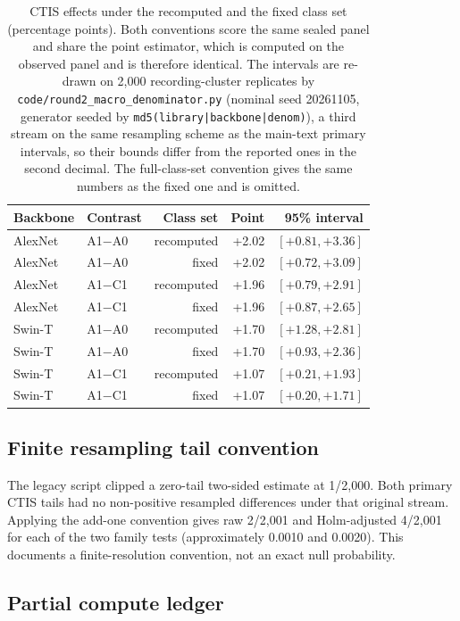 \begin{table}[t]
\centering
\caption{CTIS effects under the recomputed and the fixed class set (percentage points). Both
conventions score the same sealed panel and share the point estimator, which is computed on the
observed panel and is therefore identical. The intervals are re-drawn on 2{,}000
recording-cluster replicates by \texttt{code/round2\_macro\_denominator.py} (nominal seed
20261105, generator seeded by \texttt{md5(library|backbone|denom)}), a third stream on the same
resampling scheme as the main-text primary intervals, so their bounds differ
from the reported ones in the second decimal. The full-class-set convention gives the same
numbers as the fixed one and is omitted.}
\label{tab:classset}
\small
\begin{tabular}{llrrr}
\toprule
Backbone & Contrast & Class set & Point & 95\% interval \\
\midrule
AlexNet & A1$-$A0 & recomputed & +2.02 & $[+0.81,+3.36]$ \\
AlexNet & A1$-$A0 & fixed      & +2.02 & $[+0.72,+3.09]$ \\
AlexNet & A1$-$C1 & recomputed & +1.96 & $[+0.79,+2.91]$ \\
AlexNet & A1$-$C1 & fixed      & +1.96 & $[+0.87,+2.65]$ \\
Swin-T  & A1$-$A0 & recomputed & +1.70 & $[+1.28,+2.81]$ \\
Swin-T  & A1$-$A0 & fixed      & +1.70 & $[+0.93,+2.36]$ \\
Swin-T  & A1$-$C1 & recomputed & +1.07 & $[+0.21,+1.93]$ \\
Swin-T  & A1$-$C1 & fixed      & +1.07 & $[+0.20,+1.71]$ \\
\bottomrule
\end{tabular}
\end{table}

\subsection{Finite resampling tail convention}

The legacy script clipped a zero-tail two-sided estimate at 1/2,000. Both primary CTIS tails had no non-positive resampled differences under that original stream. Applying the add-one convention gives raw 2/2,001 and Holm-adjusted 4/2,001 for each of the two family tests (approximately 0.0010 and 0.0020). This documents a finite-resolution convention, not an exact null probability.

\subsection{Partial compute ledger}

